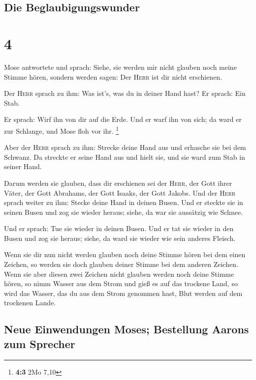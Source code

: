 \hypertarget{die-beglaubigungswunder}{%
\subsection{Die Beglaubigungswunder}\label{die-beglaubigungswunder}}

\hypertarget{section-3}{%
\section{4}\label{section-3}}

 Mose antwortete und sprach: Siehe, sie werden mir nicht
glauben noch meine Stimme hören, sondern werden sagen: Der \textsc{Herr}
ist dir nicht erschienen.

 Der \textsc{Herr} sprach zu ihm: Was ist's, was du in
deiner Hand hast? Er sprach: Ein Stab.

 Er sprach: Wirf ihn von dir auf die Erde. Und er warf ihn
von sich; da ward er zur Schlange, und Mose floh vor ihr. \footnote{\textbf{4:3}
  2Mo 7,10}

 Aber der \textsc{Herr} sprach zu ihm: Strecke deine Hand
aus und erhasche sie bei dem Schwanz. Da streckte er seine Hand aus und
hielt sie, und sie ward zum Stab in seiner Hand.

 Darum werden sie glauben, dass dir erschienen sei der
\textsc{Herr}, der Gott ihrer Väter, der Gott Abrahams, der Gott Isaaks,
der Gott Jakobs.  Und der \textsc{Herr} sprach weiter zu
ihm: Stecke deine Hand in deinen Busen. Und er steckte sie in seinen
Busen und zog sie wieder heraus; siehe, da war sie aussätzig wie Schnee.

 Und er sprach: Tue sie wieder in deinen Busen. Und er tat
sie wieder in den Busen und zog sie heraus; siehe, da ward sie wieder
wie sein anderes Fleisch.

 Wenn sie dir nun nicht werden glauben noch deine Stimme
hören bei dem einen Zeichen, so werden sie doch glauben deiner Stimme
bei dem anderen Zeichen.  Wenn sie aber diesen zwei
Zeichen nicht glauben werden noch deine Stimme hören, so nimm Wasser aus
dem Strom und gieß es auf das trockene Land, so wird das Wasser, das du
aus dem Strom genommen hast, Blut werden auf dem trockenen Lande.

\hypertarget{neue-einwendungen-moses-bestellung-aarons-zum-sprecher}{%
\subsection{Neue Einwendungen Moses; Bestellung Aarons zum
Sprecher}\label{neue-einwendungen-moses-bestellung-aarons-zum-sprecher}}

